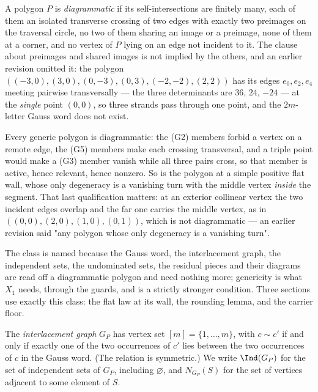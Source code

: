 \begin{definition}\label{CV:def:diagrammatic}\leanok
A polygon $P$ is \emph{diagrammatic} if its self-intersections are finitely
many, each of them an isolated transverse crossing of two edges with exactly two
preimages on the traversal circle, no two of them sharing an image or a
preimage, none of them at a corner, and no vertex of $P$ lying on an edge not
incident to it. The clause about preimages and shared images is not implied by
the others, and an earlier revision omitted it: the polygon
$((-3,0),(3,0),(0,-3),(0,3),(-2,-2),(2,2))$ has its edges $e_0,e_2,e_4$ meeting
pairwise transversally --- the three determinants are $36$, $24$, $-24$ --- at
the \emph{single} point $(0,0)$, so three strands pass through one point, and the
$2m$-letter Gauss word does not exist.

Every generic polygon is diagrammatic: the (G2) members forbid a vertex on a
remote edge, the (G5) members make each crossing transversal, and a triple point
would make a (G3) member vanish while all three pairs cross, so that member is
active, hence relevant, hence nonzero. So is the polygon at a simple positive
flat wall, whose only degeneracy is a vanishing turn with the middle vertex
\emph{inside} the segment. That last qualification matters: at an exterior
collinear vertex the two incident edges overlap and the far one carries the
middle vertex, as in $((0,0),(2,0),(1,0),(0,1))$, which is not diagrammatic ---
an earlier revision said "any polygon whose only degeneracy is a vanishing
turn".

The class is named because the Gauss word, the interlacement graph, the
independent sets, the undominated sets, the residual pieces and their diagrams
are read off a diagrammatic polygon and need nothing more; genericity is what
$X_1$ needs, through the guards, and is a strictly stronger condition. Three
sections use exactly this class: the flat law at its wall, the rounding lemma,
and the carrier floor.
\end{definition}

\begin{definition}\label{CV:def:interlace}\leanok
The \emph{interlacement graph} $G_P$ has vertex set $[m]=\{1,\dots,m\}$, with
$c\sim c'$ if and only if exactly one of the two occurrences of $c'$ lies between
the two occurrences of $c$ in the Gauss word. (The relation is symmetric.) We
write $\Ind(G_P)$ for the set of independent sets of $G_P$, including
$\varnothing$, and $N_{G_P}(S)$ for the set of vertices adjacent to some element
of $S$.
\end{definition}

